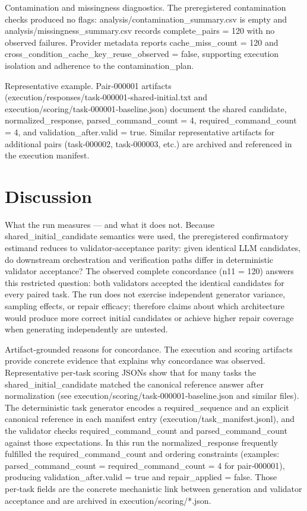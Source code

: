 \documentclass[conference]{IEEEtran}
\begin{document}
Contamination and missingness diagnostics. The preregistered contamination checks produced no flags: analysis/contamination\_summary.csv is empty and analysis/missingness\_summary.csv records complete\_pairs = 120 with no observed failures. Provider metadata reports cache\_miss\_count = 120 and cross\_condition\_cache\_key\_reuse\_observed = false, supporting execution isolation and adherence to the contamination\_plan.

Representative example. Pair‑000001 artifacts (execution/responses/task‑000001‑shared‑initial.txt and execution/scoring/task‑000001‑baseline.json) document the shared candidate, normalized\_response, parsed\_command\_count = 4, required\_command\_count = 4, and validation\_after.valid = true. Similar representative artifacts for additional pairs (task‑000002, task‑000003, etc.) are archived and referenced in the execution manifest.

\section{Discussion}
What the run measures --- and what it does not. Because shared\_initial\_candidate semantics were used, the preregistered confirmatory estimand reduces to validator‑acceptance parity: given identical LLM candidates, do downstream orchestration and verification paths differ in deterministic validator acceptance? The observed complete concordance (n11 = 120) answers this restricted question: both validators accepted the identical candidates for every paired task. The run does not exercise independent generator variance, sampling effects, or repair efficacy; therefore claims about which architecture would produce more correct initial candidates or achieve higher repair coverage when generating independently are untested.

Artifact‑grounded reasons for concordance. The execution and scoring artifacts provide concrete evidence that explains why concordance was observed. Representative per‑task scoring JSONs show that for many tasks the shared\_initial\_candidate matched the canonical reference answer after normalization (see execution/scoring/task‑000001‑baseline.json and similar files). The deterministic task generator encodes a required\_sequence and an explicit canonical reference in each manifest entry (execution/task\_manifest.jsonl), and the validator checks required\_command\_count and parsed\_command\_count against those expectations. In this run the normalized\_response frequently fulfilled the required\_command\_count and ordering constraints (examples: parsed\_command\_count = required\_command\_count = 4 for pair‑000001), producing validation\_after.valid = true and repair\_applied = false. Those per‑task fields are the concrete mechanistic link between generation and validator acceptance and are archived in execution/scoring/*.json.
\end{document}
